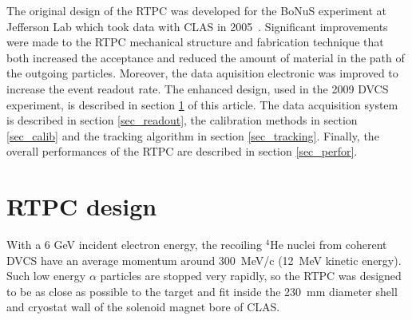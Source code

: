\documentclass[preprint,5p]{elsarticle}
\begin{document}
The original design of the RTPC was developed for the BoNuS 
experiment at Jefferson Lab which took data with CLAS in 
2005~\cite{Fenker:2008zz}. Significant improvements were made to the RTPC mechanical 
structure and fabrication technique that both increased the acceptance and 
reduced the amount of material in the path of the outgoing particles. 
Moreover, the data aquisition electronic was improved to increase the event 
readout rate. The enhanced design, 
used in the 2009 DVCS experiment, is described in section \ref{sec_design} of 
this article. The data acquisition system is described in section \ref{sec_readout}, 
the calibration methods in section \ref{sec_calib} and the tracking algorithm in section
\ref{sec_tracking}. Finally, the overall performances
of the RTPC are described in section \ref{sec_perfor}.

\section{RTPC design} \label{sec_design}

With a 6 GeV incident electron energy, the recoiling $^{4}$He nuclei from 
coherent DVCS have an average momentum around 300~MeV/c (12~MeV kinetic 
energy). Such low energy $\alpha$ particles are stopped very rapidly, so the 
RTPC was designed to be as close as possible to the target and fit inside the 
230~mm diameter shell and cryostat wall of the solenoid magnet bore of CLAS.
\end{document}
